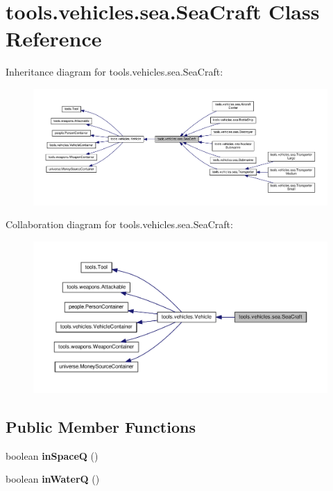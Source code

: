 \hypertarget{classtools_1_1vehicles_1_1sea_1_1_sea_craft}{}\section{tools.\+vehicles.\+sea.\+Sea\+Craft Class Reference}
\label{classtools_1_1vehicles_1_1sea_1_1_sea_craft}


Inheritance diagram for tools.\+vehicles.\+sea.\+Sea\+Craft\+:\nopagebreak
\begin{figure}[H]
\begin{center}
\leavevmode
\includegraphics[width=350pt]{classtools_1_1vehicles_1_1sea_1_1_sea_craft__inherit__graph}
\end{center}
\end{figure}


Collaboration diagram for tools.\+vehicles.\+sea.\+Sea\+Craft\+:\nopagebreak
\begin{figure}[H]
\begin{center}
\leavevmode
\includegraphics[width=350pt]{classtools_1_1vehicles_1_1sea_1_1_sea_craft__coll__graph}
\end{center}
\end{figure}
\subsection*{Public Member Functions}
\begin{DoxyCompactItemize}
\item 
boolean {\bfseries in\+SpaceQ} ()\hypertarget{classtools_1_1vehicles_1_1sea_1_1_sea_craft_a436a61781e073f8c119ef464375fe4a6}{}\label{classtools_1_1vehicles_1_1sea_1_1_sea_craft_a436a61781e073f8c119ef464375fe4a6}

\item 
boolean {\bfseries in\+WaterQ} ()\hypertarget{classtools_1_1vehicles_1_1sea_1_1_sea_craft_ae48192b6ec5d07e0570cec2cbe7d8828}{}\label{classtools_1_1vehicles_1_1sea_1_1_sea_craft_ae48192b6ec5d07e0570cec2cbe7d8828}

\end{DoxyCompactItemize}

